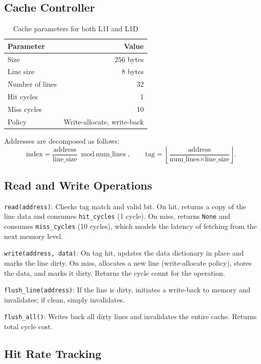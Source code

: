 \documentclass[10pt,a4paper,twoside]{book}
\begin{document}
\subsection{Cache Controller}

\begin{table}[H]
\centering
\caption{Cache parameters for both L1I and L1D}
\label{tab:cacheparams}
\begin{tabular}{lr}
\toprule
Parameter & Value \\
\midrule
Size & 256 bytes \\
Line size & 8 bytes \\
Number of lines & 32 \\
Hit cycles & 1 \\
Miss cycles & 10 \\
Policy & Write-allocate, write-back \\
\bottomrule
\end{tabular}
\end{table}

Addresses are decomposed as follows:
\[
\text{index} = \frac{\text{address}}{\text{line\_size}} \bmod \text{num\_lines},\qquad
\text{tag} = \left\lfloor\frac{\text{address}}{\text{num\_lines} \times \text{line\_size}}\right\rfloor.
\]

\subsection{Read and Write Operations}

\noindent\texttt{read(address)}: Checks tag match and valid bit. On hit,
returns a copy of the line data and consumes \texttt{hit\_cycles} (1 cycle).
On miss, returns \texttt{None} and consumes \texttt{miss\_cycles} (10
cycles), which models the latency of fetching from the next memory level.

\noindent\texttt{write(address, data)}: On tag hit, updates the data
dictionary in place and marks the line dirty. On miss, allocates a new line
(write-allocate policy), stores the data, and marks it dirty. Returns the
cycle count for the operation.

\noindent\texttt{flush\_line(address)}: If the line is dirty, initiates a
write-back to memory and invalidates; if clean, simply invalidates.

\noindent\texttt{flush\_all()}: Writes back all dirty lines and invalidates
the entire cache. Returns total cycle cost.

\subsection{Hit Rate Tracking}
\end{document}
